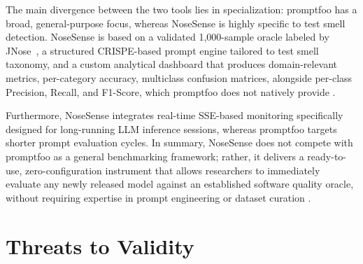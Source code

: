 \documentclass[sigconf]{acmart}
\begin{document}
The main divergence between the two tools lies in specialization: promptfoo has a broad, general-purpose focus, whereas NoseSense is highly specific to test smell detection. NoseSense is based on a validated 1,000-sample oracle labeled by JNose~\cite{virginio2020jnose}, a structured CRISPE-based prompt engine tailored to test smell taxonomy, and a custom analytical dashboard that produces domain-relevant metrics, per-category accuracy, multiclass confusion matrices, alongside per-class Precision, Recall, and F1-Score, which promptfoo does not natively provide \cite{webster2023promptfoo,shankar2024validates,10.1145/3772318.3790897}.




Furthermore, NoseSense integrates real-time SSE-based monitoring specifically designed for long-running LLM inference sessions, whereas promptfoo targets shorter prompt evaluation cycles. In summary, NoseSense does not compete with promptfoo as a general benchmarking framework; rather, it delivers a ready-to-use, zero-configuration instrument that allows researchers to immediately evaluate any newly released model against an established software quality oracle, without requiring expertise in prompt engineering or dataset curation \cite{webster2023promptfoo,shankar2024validates,10.1145/3772318.3790897}.

\section{Threats to Validity}
\label{sec:ameacas}
\end{document}
